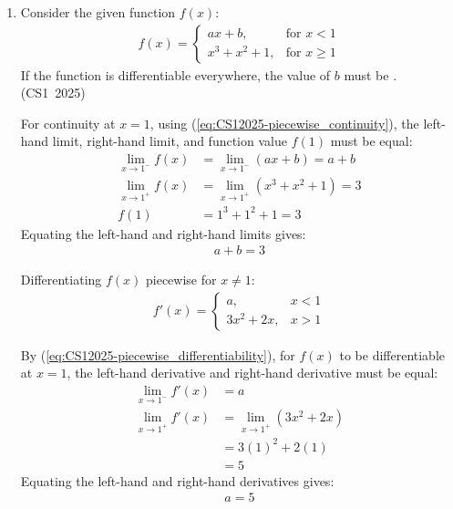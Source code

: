 \begin{enumerate}[label=\thesubsection.\arabic*, ref=\thesubsection.\theenumi]
\vspace{0.5cm}
\item Consider the given function $f(x)$:
\begin{align*}
f(x) = \begin{cases} ax + b, & \text{for } x < 1 \\ x^3 + x^2 + 1, & \text{for } x \ge 1 \end{cases}
\end{align*}
If the function is differentiable everywhere, the value of $b$ must be \underline{\hspace{1cm}}.
\hfill (CS1~2025)

\vspace{0.2cm}
\solution
For continuity at $x = 1$, using (\ref{eq:CS12025-piecewise_continuity}), the left-hand limit, right-hand limit, and function value $f(1)$ must be equal:
\begin{align}
\lim_{x \to 1^-} f(x) &= \lim_{x \to 1^-} (ax + b) = a + b \label{eq:cont_lhs} \\
\lim_{x \to 1^+} f(x) &= \lim_{x \to 1^+} (x^3 + x^2 + 1) = 3 \\
f(1) &= 1^3 + 1^2 + 1 = 3
\end{align}
Equating the left-hand and right-hand limits gives:
\begin{align}
a + b = 3 \label{eq:cont}
\end{align}

Differentiating $f(x)$ piecewise for $x \neq 1$:
\begin{align}
f'(x) = \begin{cases} a, & x < 1 \\ 3x^2 + 2x, & x > 1 \end{cases}
\end{align}

By (\ref{eq:CS12025-piecewise_differentiability}), for $f(x)$ to be differentiable at $x = 1$, the left-hand derivative and right-hand derivative must be equal:
\begin{align}
\lim_{x \to 1^-} f'(x) &= a \\
\lim_{x \to 1^+} f'(x) &= \lim_{x \to 1^+} (3x^2 + 2x) \\
                       &= 3(1)^2 + 2(1) \\
                       &= 5
\end{align}
Equating the left-hand and right-hand derivatives gives:
\begin{align}
a = 5
\end{align}


\end{enumerate}
